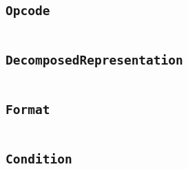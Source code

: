     \begin{landscape}
    \section{\texttt{Opcode}}\label{code:Opcode}
    \begin{multicols}{2} %
    \inputminted[mathescape,
        linenos,
        numbersep=5pt,
        frame=none,
        framesep=2mm,
        fontsize=\footnotesize]{java}{../src/main/java/se/filipallberg/dark/mips32decompiler/instruction/util/Opcode.java}
    \end{multicols}
    \end{landscape}
    


    \begin{landscape}
    \section{\texttt{DecomposedRepresentation}}\label{code:DecomposedRepresentation}
    \begin{multicols}{2} %
    \inputminted[mathescape,
        linenos,
        numbersep=5pt,
        frame=none,
        framesep=2mm,
        fontsize=\footnotesize]{java}{../src/main/java/se/filipallberg/dark/mips32decompiler/instruction/util/DecomposedRepresentation.java}
    \end{multicols}
    \end{landscape}
    


    \begin{landscape}
    \section{\texttt{Format}}\label{code:Format}
    \begin{multicols}{2} %
    \inputminted[mathescape,
        linenos,
        numbersep=5pt,
        frame=none,
        framesep=2mm,
        fontsize=\footnotesize]{java}{../src/main/java/se/filipallberg/dark/mips32decompiler/instruction/util/Format.java}
    \end{multicols}
    \end{landscape}
    


    \begin{landscape}
    \section{\texttt{Condition}}\label{code:Condition}
    \begin{multicols}{2} %
    \inputminted[mathescape,
        linenos,
        numbersep=5pt,
        frame=none,
        framesep=2mm,
        fontsize=\footnotesize]{java}{../src/main/java/se/filipallberg/dark/mips32decompiler/instruction/Condition.java}
    \end{multicols}
    \end{landscape}
    



